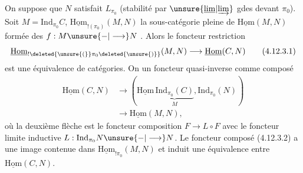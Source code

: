 On suppose que $N$ satisfait $L_{\pi_0}$ (stabilité
par $\unsure{\underline{\lim}|\underrightarrow{\lim}}$ gdes devant $\pi_0$). Soit $M=\mathrm{Ind}_{\pi_0}C$,
$\underline{\mathrm{Hom}}_{!(\pi_0)}(M,N)$ la sous-catégorie  pleine
de $\underline{\mathrm{Hom}}(M,N)$ formée des $f:M\unsure{-|\longrightarrow}N$
. Alors le foncteur
restriction
\[
 \underline{\mathrm{Hom}}_{!\deleted{\unsure{(}}\pi_0\deleted{\unsure{)}}}(M,N)
 \longrightarrow\underline{\mathrm{Hom}}(C,N) \tag*{(4.12.3.1)}
\]
est une équivalence de catégories.
On  un foncteur quasi-inverse
comme composé
\[
\begin{aligned}
 \underline{\mathrm{Hom}}(C,N)&\longrightarrow
 (\underline{\mathrm{Hom}}\,\underbrace{\mathrm{Ind}_{\pi_0}(C)}_{M},\mathrm{Ind}_{\pi_0}(N))\\
 &\longrightarrow\underline{\mathrm{Hom}}(M,N),
\end{aligned}\tag*{(4.12.3.2)}
\]
où la deuxième flèche est le foncteur
composition $F\to L\circ F$ avec le foncteur
limite inductive $L:\mathrm{Ind}_{\pi_0}N\unsure{-|\longrightarrow}N$.
Le foncteur composé (4.12.3.2) 
a une image contenue dans $\underline{\mathrm{Hom}}_{!\pi_0}(M,N)$
et induit une équivalence entre 
$\underline{\mathrm{Hom}}(C,N)$. 

